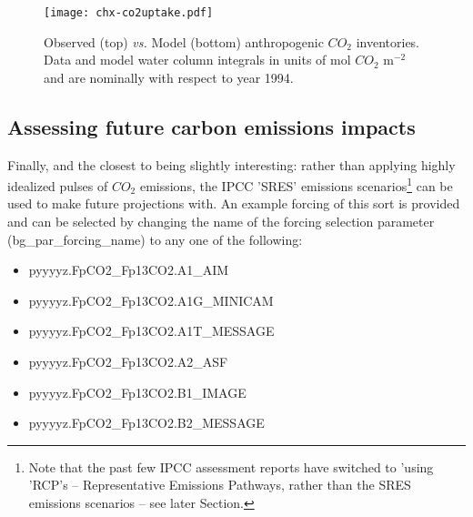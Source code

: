 \vspace{2mm}

\begin{figure}[ht]
\begin{center}
\texttt{[image: chx-co2uptake.pdf]}
\end{center}
\vspace{-10pt}
\caption{Observed (top) \textit{vs.} Model (bottom) anthropogenic \(CO_{2}\) inventories.
Data and model water column integrals in units of mol \(CO_{2}\) m$^{-2}$ and are nominally with respect to year 1994.}
\label{fig:chx-co2uptake}
\end{figure}

\newpage

\subsection{Assessing future carbon emissions impacts}

\noindent Finally, and the closest to being slightly interesting: rather than applying highly idealized pulses  of \(CO_{2}\) emissions, the IPCC 'SRES' emissions scenarios\footnote{Note that the past few IPCC assessment reports have switched to 'using 'RCP's -- Representative Emissions Pathways, rather than the SRES emissions scenarios -- see later Section.}  can be used to make future projections with. An example forcing of this sort is provided and can be selected by changing the name of the forcing selection parameter (\textsf{\footnotesize bg\_par\_forcing\_name}) to any one of the following:

\vspace{1mm}
\begin{itemize}[noitemsep]
\item \textsf{\footnotesize pyyyyz.FpCO2\_Fp13CO2.A1\_AIM}
\item \textsf{\footnotesize pyyyyz.FpCO2\_Fp13CO2.A1G\_MINICAM}
\item \textsf{\footnotesize pyyyyz.FpCO2\_Fp13CO2.A1T\_MESSAGE}
\item \textsf{\footnotesize pyyyyz.FpCO2\_Fp13CO2.A2\_ASF}
\item \textsf{\footnotesize pyyyyz.FpCO2\_Fp13CO2.B1\_IMAGE}
\item \textsf{\footnotesize pyyyyz.FpCO2\_Fp13CO2.B2\_MESSAGE}
\end{itemize}
\vspace{1mm}


